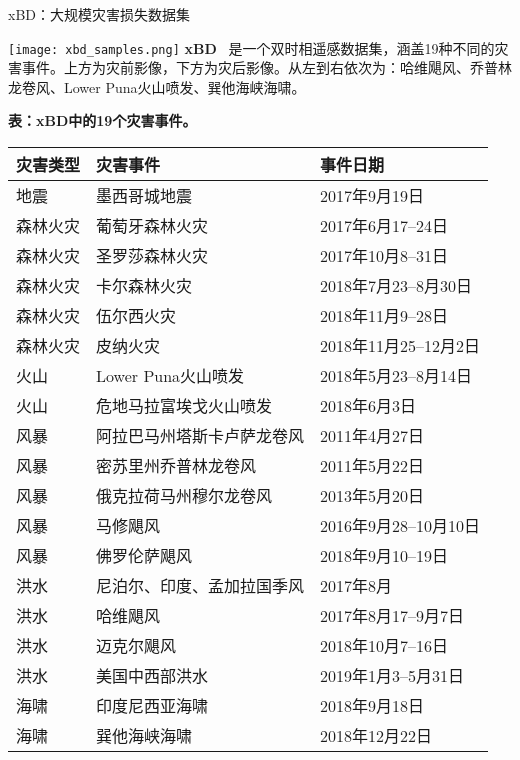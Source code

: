 \begin{refsection}
  \begin{frame}{xBD：大规模灾害损失数据集}
    \begin{minipage}{0.42\linewidth}
      \centering
      \texttt{[image: xbd\_samples.png]}
      \vspace{0.5em}
      \scriptsize
      \textbf{xBD}~\parencite{guptaCreatingXBDDataset2019} 是一个双时相遥感数据集，涵盖19种不同的灾害事件。上方为灾前影像，下方为灾后影像。从左到右依次为：哈维飓风、乔普林龙卷风、Lower Puna火山喷发、巽他海峡海啸。
    \end{minipage}%
    \hfill
    \begin{minipage}{0.55\linewidth}
      \tiny
      \centering
      \textbf{表：xBD中的19个灾害事件。}
      \begin{tabular}{lll}
        \hline
        \textbf{灾害类型} & \textbf{灾害事件} & \textbf{事件日期} \\
        \hline
        地震 & 墨西哥城地震 & 2017年9月19日 \\
        森林火灾 & 葡萄牙森林火灾 & 2017年6月17--24日 \\
        森林火灾 & 圣罗莎森林火灾 & 2017年10月8--31日 \\
        森林火灾 & 卡尔森林火灾 & 2018年7月23--8月30日 \\
        森林火灾 & 伍尔西火灾 & 2018年11月9--28日 \\
        森林火灾 & 皮纳火灾 & 2018年11月25--12月2日 \\
        火山 & Lower Puna火山喷发 & 2018年5月23--8月14日 \\
        火山 & 危地马拉富埃戈火山喷发 & 2018年6月3日 \\
        风暴 & 阿拉巴马州塔斯卡卢萨龙卷风 & 2011年4月27日 \\
        风暴 & 密苏里州乔普林龙卷风 & 2011年5月22日 \\
        风暴 & 俄克拉荷马州穆尔龙卷风 & 2013年5月20日 \\
        风暴 & 马修飓风 & 2016年9月28--10月10日 \\
        风暴 & 佛罗伦萨飓风 & 2018年9月10--19日 \\
        洪水 & 尼泊尔、印度、孟加拉国季风 & 2017年8月 \\
        洪水 & 哈维飓风 & 2017年8月17--9月7日 \\
        洪水 & 迈克尔飓风 & 2018年10月7--16日 \\
        洪水 & 美国中西部洪水 & 2019年1月3--5月31日 \\
        海啸 & 印度尼西亚海啸 & 2018年9月18日 \\
        海啸 & 巽他海峡海啸 & 2018年12月22日 \\
        \hline
      \end{tabular}
      \vspace{0.5em}

    \end{minipage}
    \bottomleftrefs
  \end{frame}
\end{refsection}

